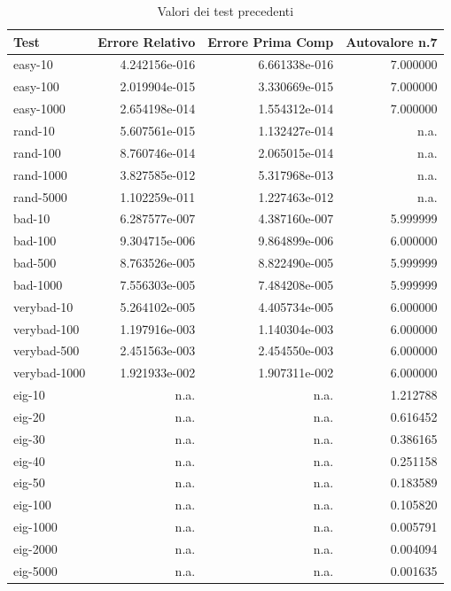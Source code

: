 \documentclass[12pt]{article}
\begin{document}
\begin{table}[h]
\caption {Valori dei test precedenti} \label{tab:title}
\begin{center}
\begin{tabular}{|l|r|r|r|}
\hline
Test         &	Errore Relativo  &	Errore Prima Comp  & Autovalore n.7 \\
\hline
     easy-10 &	    4.242156e-016 &	     6.661338e-016 &  				 7.000000 \\
    easy-100 &	    2.019904e-015 &	     3.330669e-015 &           7.000000 \\
   easy-1000 &	    2.654198e-014 &	     1.554312e-014 &           7.000000 \\
     rand-10 &	    5.607561e-015  &	   1.132427e-014 &               n.a. \\
    rand-100 &	    8.760746e-014 &	     2.065015e-014 &               n.a. \\
   rand-1000 &	     3.827585e-012 &	   5.317968e-013 &               n.a. \\
   rand-5000 &	   1.102259e-011   &	   1.227463e-012 &               n.a. \\
      bad-10 &	    6.287577e-007  &	   4.387160e-007 &           5.999999 \\
     bad-100 &	    9.304715e-006 &	     9.864899e-006 &           6.000000 \\
     bad-500 &	    8.763526e-005 &	     8.822490e-005 &           5.999999 \\
    bad-1000 &	    7.556303e-005 &	     7.484208e-005 &           5.999999 \\
  verybad-10 &	    5.264102e-005 &	     4.405734e-005 &           6.000000 \\
 verybad-100 &	    1.197916e-003 &	     1.140304e-003 &           6.000000 \\
 verybad-500 &	    2.451563e-003 &	     2.454550e-003 &           6.000000  \\
verybad-1000 &	    1.921933e-002 &	     1.907311e-002 &           6.000000 \\
      eig-10 &	            n.a. &	              n.a. &           1.212788 \\
      eig-20 &	            n.a. &	              n.a. &           0.616452  \\
      eig-30 &	            n.a. &	              n.a. &           0.386165 \\
      eig-40 &	            n.a. &	              n.a. &           0.251158  \\
      eig-50 &	            n.a. &	              n.a. &           0.183589  \\
     eig-100 &	            n.a. &	              n.a. &           0.105820 \\
    eig-1000 &	            n.a. &	              n.a. &           0.005791 \\
    eig-2000 &	            n.a. &	              n.a. &           0.004094 \\
    eig-5000 &	            n.a. &	              n.a. &           0.001635 \\
\hline
\end{tabular}
\end{center}
\end{table}
\end{document}
